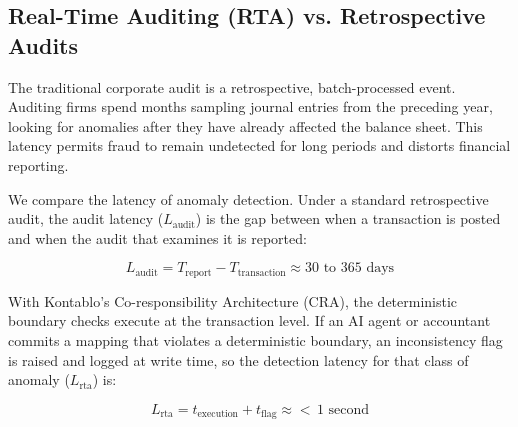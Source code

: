 \subsection{Real-Time Auditing (RTA) vs. Retrospective Audits}
The traditional corporate audit is a retrospective, batch-processed event. Auditing firms spend months sampling journal entries from the preceding year, looking for anomalies after they have already affected the balance sheet. This latency permits fraud to remain undetected for long periods and distorts financial reporting.

We compare the latency of anomaly detection. Under a standard retrospective audit, the audit latency ($L_{\text{audit}}$) is the gap between when a transaction is posted and when the audit that examines it is reported:

\begin{equation}\label{eq:l_audit}
L_{\text{audit}} = T_{\text{report}} - T_{\text{transaction}} \approx 30 \text{ to } 365 \text{ days}
\end{equation}

With Kontablo's Co-responsibility Architecture (CRA), the deterministic boundary checks execute at the transaction level. If an AI agent or accountant commits a mapping that violates a deterministic boundary, an inconsistency flag is raised and logged at write time, so the detection latency for that class of anomaly ($L_{\text{rta}}$) is:

\begin{equation}\label{eq:l_rta}
L_{\text{rta}} = t_{\text{execution}} + t_{\text{flag}} \approx {<}\,1 \text{ second}
\end{equation}

